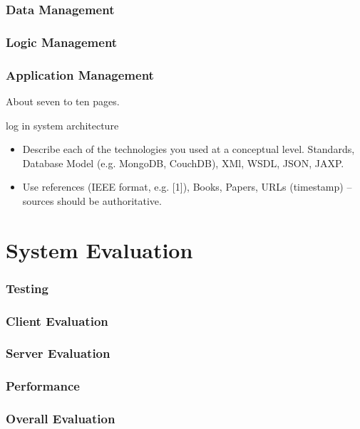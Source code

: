 \subsection{Data  Management  }
\subsection{Logic   Management  }
\subsection{Application   Management }


 About seven to ten pages.
 
 
 
 log in system architecture 
 
 
 
 
 
\begin{itemize}
\item Describe each of the technologies you used at a conceptual level. Standards, Database Model (e.g. MongoDB, CouchDB), XMl, WSDL, JSON, JAXP.
\item Use references (IEEE format, e.g. [1]), Books, Papers, URLs (timestamp) – sources should be authoritative. 
\end{itemize}


\chapter{System Evaluation}

\subsection{Testing}
\subsection{Client Evaluation}
\subsection{Server Evaluation}
\subsection{Performance}
\subsection{Overall  Evaluation}





